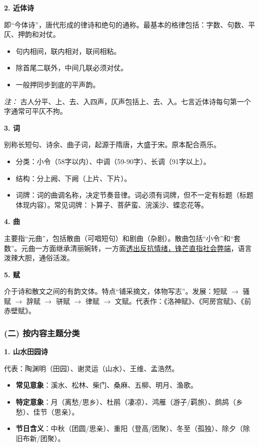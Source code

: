 \documentclass[11pt,a4paper]{article}
\begin{document}
\textbf{2. 近体诗}

即“今体诗”，唐代形成的律诗和绝句的通称。最基本的格律包括：字数、句数、平仄、押韵和对仗。
\begin{itemize}
    \item 句内相间，联内相对，联间相粘。
    \item 除首尾二联外，中间几联必须对仗。
    \item 一般押同步到底的平声韵。
\end{itemize}
\textit{注：} 古人分平、上、去、入四声，仄声包括上、去、入。七言近体诗每句第一个字通常可平仄不拘。

\textbf{3. 词}

别称长短句、诗余、曲子词，起源于隋唐，大盛于宋。原本配合燕乐。
\begin{itemize}
    \item 分类：小令（58字以内）、中调（59-90字）、长调（91字以上）。
    \item 结构：分上阙、下阙（上片、下片）。
    \item 词牌：词的曲调名称，决定节奏音律。词必须有词牌，但不一定有标题（标题体现内容）。常见词牌：卜算子、菩萨蛮、浣溪沙、蝶恋花等。
\end{itemize}

\textbf{4. 曲}

主要指“元曲”，包括散曲（可唱短句）和剧曲（杂剧）。散曲包括“小令”和“套数”。元曲一方面继承清丽婉转，一方面\underline{透出反抗情绪，锋芒直指社会弊端}，语言泼辣大胆，通俗活泼。

\textbf{5. 赋}

介于诗和散文之间的有韵文体。特点“铺采摘文，体物写志”。发展：短赋 $\to$ 骚赋 $\to$ 辞赋 $\to$ 骈赋 $\to$ 律赋 $\to$ 文赋。代表作：《洛神赋》、《阿房宫赋》、《前赤壁赋》。

\subsubsection{(二) 按内容主题分类}

\textbf{1. 山水田园诗}

代表：陶渊明（田园）、谢灵运（山水）、王维、孟浩然。
\begin{itemize}
    \item \textbf{常见意象}：溪水、松林、柴门、桑麻、五柳、明月、渔歌。
    \item \textbf{特定意象}：月（离愁/思乡）、杜鹃（凄凉）、鸿雁（游子/羁旅）、鹧鸪（乡愁）、佳节（思亲）。
    \item \textbf{节日含义}：中秋（团圆/思亲）、重阳（登高/团聚）、冬至（孤独）、除夕（除旧布新/团聚）。
\end{itemize}
\end{document}
